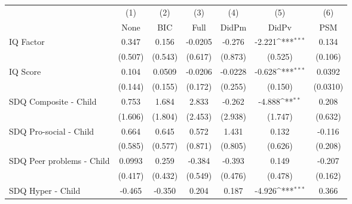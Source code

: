 {
\def\sym#1{\ifmmode^{#1}\else\(^{#1}\)\fi}
\begin{tabular}{l*{6}{c}}
\toprule
            &\multicolumn{1}{c}{(1)}&\multicolumn{1}{c}{(2)}&\multicolumn{1}{c}{(3)}&\multicolumn{1}{c}{(4)}&\multicolumn{1}{c}{(5)}&\multicolumn{1}{c}{(6)}\\
            &\multicolumn{1}{c}{None}&\multicolumn{1}{c}{BIC}&\multicolumn{1}{c}{Full}&\multicolumn{1}{c}{DidPm}&\multicolumn{1}{c}{DidPv}&\multicolumn{1}{c}{PSM}\\
\midrule
IQ Factor   &       0.347         &       0.156         &     -0.0205         &      -0.276         &      -2.221\sym{***}&       0.134         \\
            &     (0.507)         &     (0.543)         &     (0.617)         &     (0.873)         &     (0.525)         &     (0.106)         \\
\addlinespace
IQ Score    &       0.104         &      0.0509         &     -0.0206         &     -0.0228         &      -0.628\sym{***}&      0.0392         \\
            &     (0.144)         &     (0.155)         &     (0.172)         &     (0.255)         &     (0.150)         &    (0.0310)         \\
\addlinespace
SDQ Composite - Child&       0.753         &       1.684         &       2.833         &      -0.262         &      -4.888\sym{**} &       0.208         \\
            &     (1.606)         &     (1.804)         &     (2.453)         &     (2.938)         &     (1.747)         &     (0.632)         \\
\addlinespace
SDQ Pro-social - Child&       0.664         &       0.645         &       0.572         &       1.431         &       0.132         &      -0.116         \\
            &     (0.585)         &     (0.577)         &     (0.871)         &     (0.805)         &     (0.626)         &     (0.208)         \\
\addlinespace
SDQ Peer problems - Child&      0.0993         &       0.259         &      -0.384         &      -0.393         &       0.149         &      -0.207         \\
            &     (0.417)         &     (0.432)         &     (0.549)         &     (0.476)         &     (0.478)         &     (0.162)         \\
\addlinespace
SDQ Hyper - Child&      -0.465         &      -0.350         &       0.204         &       0.187         &      -4.926\sym{***}&       0.366         \\

\end{tabular}}
